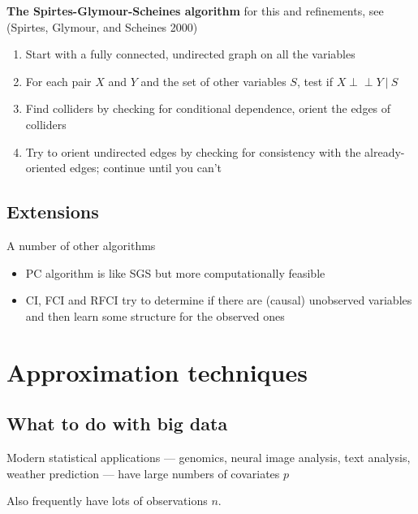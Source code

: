 \documentclass[]{article}
\providecommand{\tightlist}{%
  \setlength{\itemsep}{0pt}\setlength{\parskip}{0pt}}
\begin{document}
\textbf{The Spirtes-Glymour-Scheines algorithm} for this and
refinements, see (Spirtes, Glymour, and Scheines 2000)

\begin{enumerate}
\def\labelenumi{\arabic{enumi}.}
\tightlist
\item
  Start with a fully connected, undirected graph on all the variables
\item
  For each pair \(X\) and \(Y\) and the set of other variables \(S\),
  test if \(X\perp\!\!\!\perp Y \ \vert\ S\)
\item
  Find colliders by checking for conditional dependence, orient the
  edges of colliders
\item
  Try to orient undirected edges by checking for consistency with the
  already-oriented edges; continue until you can't
\end{enumerate}

\hypertarget{extensions}{%
\subsection{Extensions}\label{extensions}}

A number of other algorithms

\begin{itemize}
\tightlist
\item
  PC algorithm is like SGS but more computationally feasible
\item
  CI, FCI and RFCI try to determine if there are (causal) unobserved
  variables and then learn some structure for the observed ones
\end{itemize}

\hypertarget{approximation-techniques}{%
\section{Approximation techniques}\label{approximation-techniques}}

\hypertarget{what-to-do-with-big-data}{%
\subsection{What to do with big data}\label{what-to-do-with-big-data}}

Modern statistical applications --- genomics, neural image analysis,
text analysis, weather prediction --- have large numbers of covariates
\(p\)

Also frequently have lots of observations \(n\).
\end{document}
